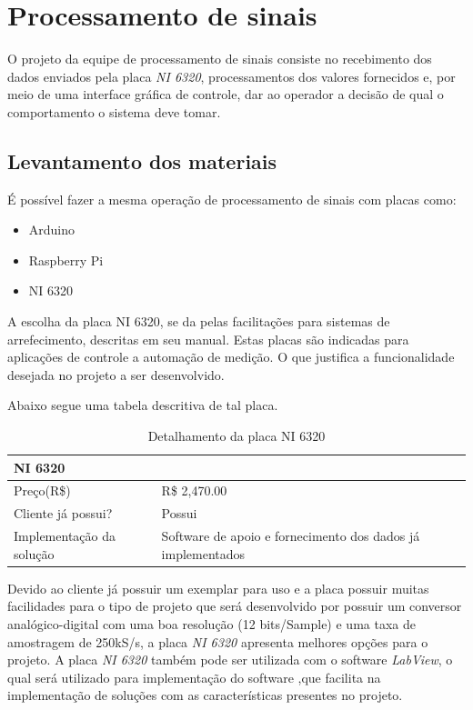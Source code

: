 \newpage
\section{Processamento de sinais}


O projeto da equipe de processamento de sinais consiste no recebimento dos dados enviados pela placa \textit{NI 6320}, processamentos dos valores fornecidos e, por meio de uma interface gráfica de controle, dar ao operador a decisão de qual o comportamento o sistema deve tomar.

\subsection{Levantamento dos materiais}

É possível fazer a mesma operação de processamento de sinais com placas como:
\begin{itemize}
    \item Arduino
    \item Raspberry Pi
    \item NI 6320
    
\end{itemize}

A escolha da placa NI 6320, se da pelas facilitações para sistemas de arrefecimento, descritas em seu manual. Estas placas são indicadas para aplicações de controle a automação de medição. O que justifica a funcionalidade desejada no projeto a ser desenvolvido.


Abaixo segue uma tabela descritiva de tal placa.

    \begin{table}[htb]
        \centering
        \begin{tabular}{|p{3cm}|p{3cm}|}
        \hline
        NI 6320  & \\ \hline
        Preço(R\$) & R\$ 2,470.00 \\ \hline
        Cliente já possui? & Possui \\ \hline
        Implementação da solução & Software de apoio e fornecimento dos dados já implementados\\ \hline
        \end{tabular}
        \caption{Detalhamento da placa NI 6320}
        \end{table}


Devido ao cliente já possuir um exemplar para uso e a placa possuir muitas facilidades para o tipo de projeto que será desenvolvido por possuir um conversor analógico-digital com uma boa resolução (12 bits/Sample) e uma taxa de amostragem de 250kS/s, a placa \textit{NI 6320} apresenta melhores opções para o projeto.
A placa \textit{NI 6320} também pode ser utilizada com o software \textit{LabView}, o qual será utilizado para implementação do software ,que facilita na implementação de soluções com as características presentes no projeto.

